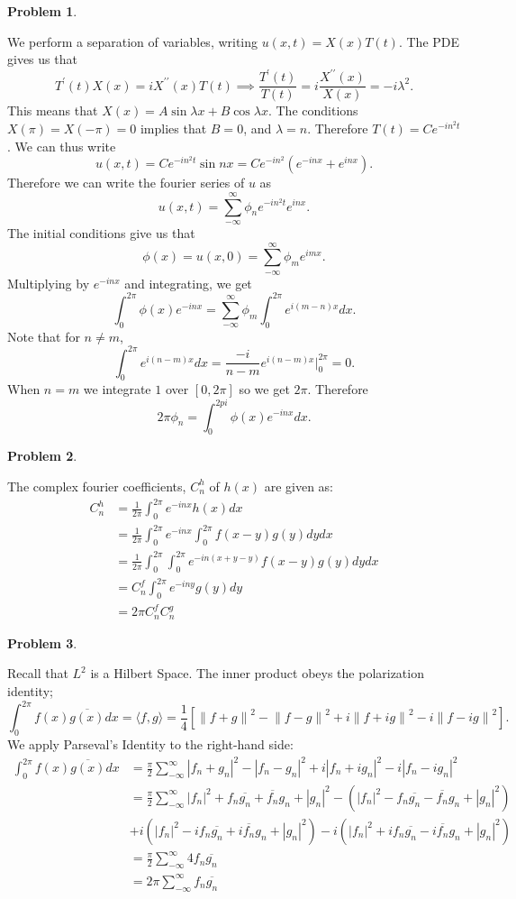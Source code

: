 \documentclass[12pt, a4paper]{article}
\title{}
\author{A.N.}
\date{\today}
\newtheorem{problem}{Problem}
\theoremstyle{definition}
\newcommand{\ol}{\overline}
\newcommand{\lan}{\langle}
\newcommand{\ran}{\rangle}
\newcommand{\norm}[1]{\left\lVert#1\right\rVert}
\newcommand{\inn}[1]{\lan#1\ran}
\begin{document}
\begin{problem}
\end{problem}
We perform a separation of variables, writing $u(x,t) = X(x)T(t)$. The PDE gives us that
$$T^\prime (t)X(x) = i X^{\prime\prime}(x)T(t) \implies \frac{T^\prime(t)}{T(t)} = i\frac{X^{\prime \prime}(x)}{X(x)} = -i\lambda^2.$$
This means that $X(x) = A\sin \lambda x + B \cos \lambda x$. The conditions $X(\pi) = X(-\pi) = 0$ implies that $B=0$, and $\lambda = n$. Therefore $T(t) = Ce^{-in^2 t}$. 
We can thus write $$u(x,t)= Ce^{-in^2t}\sin nx = Ce^{-in^2}\left( e^{-inx} + e^{inx} \right).$$
Therefore we can write the fourier series of $u$ as $$u(x,t)  = \sum_{-\infty}^\infty \phi_n e^{-in^2 t}e^{inx}.$$
The initial conditions give us that $$\phi(x) = u(x,0) = \sum_{-\infty}^\infty\phi_m e^{imx}.$$
Multiplying by $e^{-in x}$ and integrating, we get $$\int_0^{2\pi} \phi(x)e^{-inx} = \sum_{-\infty}^\infty \phi_m \int_0^{2\pi}e^{i(m-n)x}dx.$$
Note that for $n\neq m$, $$\int_0^{2\pi} e^{i(n-m)x} dx= \frac{-i}{n-m} e^{i(n-m)x}\Big|_0^{2\pi}= 0.$$
When $n=m$ we integrate $1$ over $[0,2\pi]$ so we get $2\pi$. Therefore $$2\pi \phi_n = \int_0^{2pi}\phi(x) e^{-inx}dx.$$
\newpage
\begin{problem}
\end{problem}
The complex fourier coefficients, $C_n^h$ of $h(x)$ are given as:
\begin{align*}
	C_n^h &= \frac{1}{2\pi}\int_0^{2\pi} e^{-inx}h(x) dx
	\\ & = \frac{1}{2\pi}\int_0^{2\pi}e^{-inx}  \int_0^{2\pi}f(x-y)g(y)dy dx
	\\ & = \frac{1}{2\pi}\int_0^{2\pi} \int_0^{2\pi} e^{-in(x +y-y)} f(x-y)g(y) dy dx \tag{Fubini's Theorem}
	\\ & = C_n^f \int_0^{2\pi} e^{-iny}g(y) dy 
	\\ & =2\pi C_n^f C_n^g
\end{align*}
\newpage
\begin{problem}
\end{problem}
Recall that $L^2$ is a Hilbert Space. The inner product obeys the polarization identity;
$$\int_0^{2\pi} f(x)\ol{g(x)}dx = \inn{f,g} = \frac{1}{4} \left[\norm{f+g}^2 - \norm{f-g}^2 + i\norm{f+ig}^2 - i \norm{f-ig}^2\right].$$
We apply Parseval's Identity to the right-hand side: 
\begin{align*}
	\int_0^{2\pi} f(x)\ol{g(x)}dx & = \frac{\pi}{2} \sum_{-\infty}^\infty |f_n+g_n|^2 - |f_n-g_n|^2 + i|f_n+ig_n|^2 - i|f_n-ig_n|^2
	\\ & = \frac{\pi}{2} \sum_{-\infty}^\infty |f_n|^2 + f_n\ol{g_n} + \ol{f_n}g_n + |g_n|^2- (|f_n|^2 - f_n\ol{g_n} - \ol{f_n}g_n +|g_n|^2) 
	 \\& + i(|f_n|^2 - i f_n\ol{g_n} + i\ol{f_n}g_n +|g_n|^2) - i(|f_n|^2 + i f_n\ol{g_n} - i\ol{f_n} g_n +|g_n|^2 )
	 \\ & = \frac{\pi}{2 } \sum_{-\infty}^\infty 4f_n \ol{g_n}
	 \\ & = 2\pi \sum_{-\infty}^\infty f_n \ol{g_n}
\end{align*}
\end{document}
